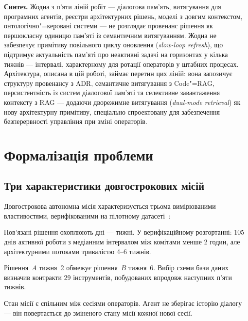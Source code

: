 \documentclass[11pt]{article}
\begin{document}
\medskip
\noindent\textbf{Синтез.}
Жодна з п'яти ліній робіт --- діалогова пам'ять, витягування для програмних
агентів, реєстри архітектурних рішень, моделі з довгим контекстом, онтологічно"=керовані системи ---
не розглядає провенанс рішення як першокласну одиницю пам'яті із семантичним
витягуванням.
Жодна не забезпечує примітиву повільного циклу оновлення (\emph{slow-loop refresh}),
що підтримує актуальність пам'яті про неактивні задачі на горизонтах у кілька
тижнів --- інтервалі, характерному для ротації операторів у штабних процесах.
Архітектура, описана в цій роботі, займає перетин цих ліній:
вона запозичує структуру провенансу з ADR, семантичне витягування
з Code"=RAG, персистентність із систем діалогової пам'яті та селективне
завантаження контексту з RAG --- додаючи дворежимне витягування
(\emph{dual-mode retrieval}) як нову архітектурну примітиву, спеціально
спроектовану для забезпечення безперервності управління при зміні операторів.


\section{Формалізація проблеми}
\label{sec:problem}

\subsection{Три характеристики довгострокових місій}

Довгострокова автономна місія характеризується трьома вимірюваними властивостями, верифікованими на пілотному датасеті~\citep{ovcharov2026edittrace}:

\begin{description}[leftmargin=1.5em, nosep]
  \item[Горизонт.] Пов'язані рішення охоплюють дні --- тижні. У верифікаційному розгортанні: 105 днів активної роботи з медіанним інтервалом між комітами менше 2 годин, але архітектурними потоками тривалістю 4--6 тижнів.
  \item[Композиційність.] Рішення~$A$ тижня~2 обмежує рішення~$B$ тижня~6. Вибір схеми бази даних визначив контракти 29 інструментів, побудованих впродовж наступних п'яти тижнів.
  \item[Персистентність.] Стан місії є спільним між сесіями операторів. Агент не зберігає історію діалогу --- він повертається до зміненого стану місії кожної нової сесії.
\end{description}
\end{document}
